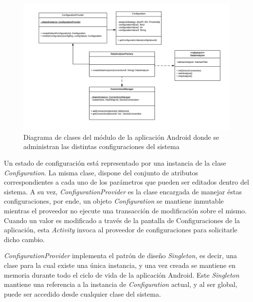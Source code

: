 \newpage

\begin{figure}[H]
    \hspace*{-3.5cm}%
    \includegraphics[clip,width=1.4 \columnwidth]{TESIS/imagenes/chap05/configuration-class-diagram.png}    
    \caption{Diagrama de clases del módulo de la aplicación Android donde se administran las distintas configuraciones del sistema}
    \label{FIG:configuration-class-diagram}
\end{figure}

Un estado de configuración está representado por una instancia de la clase \textit{Configuration}. La misma clase, dispone del conjunto de atributos correspondientes a cada uno de los parámetros que pueden ser editados dentro del sistema. A su vez, \textit{ConfigurationProvider} es la clase encargada de manejar éstas configuraciones, por ende, un objeto \textit{Configuration} se mantiene inmutable mientras el proveedor no ejecute una transacción de modificación sobre el mismo. Cuando un valor es modificado a través de la pantalla de Configuraciones de la aplicación, esta \textit{Activity} invoca al proveedor de configuraciones para solicitarle dicho cambio.

\textit{ConfigurationProvider} implementa el patrón de diseño \textit{Singleton}, es decir, una clase para la cual existe una única instancia, y una vez creada se mantiene en memoria durante todo el ciclo de vida de la aplicación Android. Este \textit{Singleton} mantiene una referencia a la instancia de \textit{Configuration} actual, y al ser global, puede ser accedido desde cualquier clase del sistema. 

